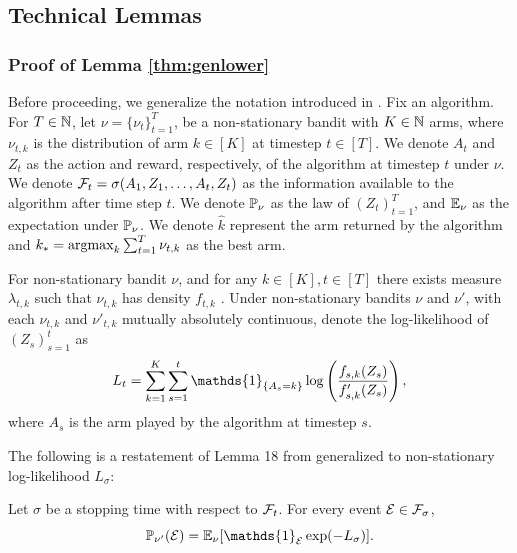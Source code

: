 \subsection{Technical Lemmas}
\subsubsection{Proof of Lemma \ref{thm:genlower}}
Before proceeding, we generalize the notation introduced in \citet{kaufmann2016complexity}. Fix an algorithm. For $T \in \N$, let $\nu = \{\nu_t\}_{t=1}^T$, be a non-stationary bandit with $K \in \N$ arms, where $\nu_{t,k}$ is the distribution of arm $k \in [K]$ at timestep $t \in [T]$.  We denote $A_t$ and $Z_t$ as the action and reward, respectively, of the algorithm at timestep $t$ under $\nu$.  We denote $\mc{F}_t = \sigma(A_1, Z_1,\dots, A_t, Z_t)$ as the information available to the algorithm after time step $t$. We denote $\P_\nu$ as the law of $(Z_t)_{t=1}^T$, and $\E_\nu$ as the expectation under $\P_\nu$. We denote $\widehat{k}$ represent the arm returned by the algorithm and $k_*= \argmax_k \sum_{t=1}^{T}\nu_{t,k}$ as the best arm. 

For non-stationary bandit ${\nu}$, and for any $k \in [K], t\in [T]$ there exists measure $\lambda_{t,k}$ such that $\nu_{t,k}$ has density $f_{t,k}$ \citep{kaufmann2016complexity}. Under non-stationary bandits  $\nu$ and $\nu'$, with each $\nu_{t,k}$ and $\nu'_{t,k}$ mutually absolutely continuous, denote the log-likelihood of $(Z_s)_{s=1}^t$ as\begin{equation}L_t=\sum_{k=1}^K\sum_{s=1}^t\mathds{1}_{\Bp{A_s=k}}\log\Sp{\frac{f_{s, k}(Z_s)}{f_{s, k}'(Z_s)}},\end{equation} where $A_s$ is the arm played by the algorithm at timestep $s$.

The following is a restatement of Lemma 18 from \citet{kaufmann2016complexity} generalized to non-stationary log-likelihood $L_\sigma$: 
\begin{lemma}\label{lem:stoppingtime}
    Let $\sigma$ be a stopping time with respect to $\mc{F}_t$. For every event $\mc{E} \in \mc{F}_\sigma$,
    \begin{equation}\P_{\nu'}(\mathcal{E}) = \E_{\nu}[\mathds{1}_{\mathcal{E}}\exp(-
L_{\sigma})].\end{equation}
\end{lemma}

